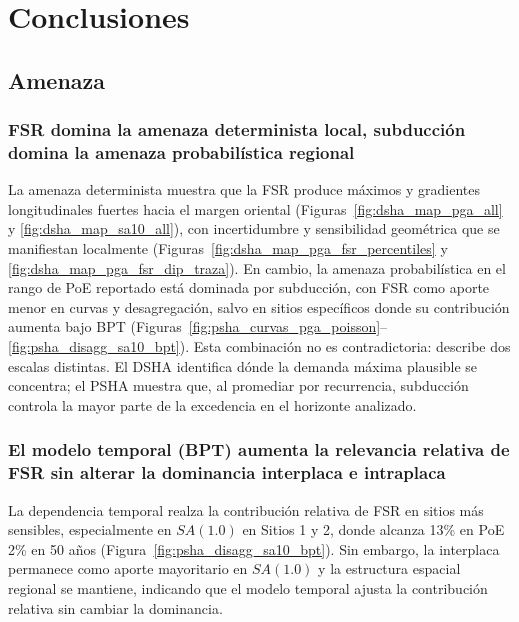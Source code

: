 \section{Conclusiones}
\label{sec:conclusiones}

\subsection{Amenaza}
\label{subsec:conc_amenaza}

\subsubsection{FSR domina la amenaza determinista local, subducción domina la amenaza probabilística regional}
\label{subsubsec:conc_amenaza_fsr_subd}

La amenaza determinista muestra que la FSR produce máximos y gradientes longitudinales fuertes hacia el margen oriental (Figuras~\ref{fig:dsha_map_pga_all} y \ref{fig:dsha_map_sa10_all}), con incertidumbre y sensibilidad geométrica que se manifiestan localmente (Figuras~\ref{fig:dsha_map_pga_fsr_percentiles} y \ref{fig:dsha_map_pga_fsr_dip_traza}). En cambio, la amenaza probabilística en el rango de PoE reportado está dominada por subducción, con FSR como aporte menor en curvas y desagregación, salvo en sitios específicos donde su contribución aumenta bajo BPT (Figuras~\ref{fig:psha_curvas_pga_poisson}--\ref{fig:psha_disagg_sa10_bpt}). Esta combinación no es contradictoria: describe dos escalas distintas. El DSHA identifica dónde la demanda máxima plausible se concentra; el PSHA muestra que, al promediar por recurrencia, subducción controla la mayor parte de la excedencia en el horizonte analizado.

\subsubsection{El modelo temporal (BPT) aumenta la relevancia relativa de FSR sin alterar la dominancia interplaca e intraplaca}
\label{subsubsec:conc_amenaza_bpt}

La dependencia temporal realza la contribución relativa de FSR en sitios más sensibles, especialmente en $SA(1.0)$ en Sitios 1 y 2, donde alcanza 13\% en PoE 2\% en 50 años (Figura~\ref{fig:psha_disagg_sa10_bpt}). Sin embargo, la interplaca permanece como aporte mayoritario en $SA(1.0)$ y la estructura espacial regional se mantiene, indicando que el modelo temporal ajusta la contribución relativa sin cambiar la dominancia.

